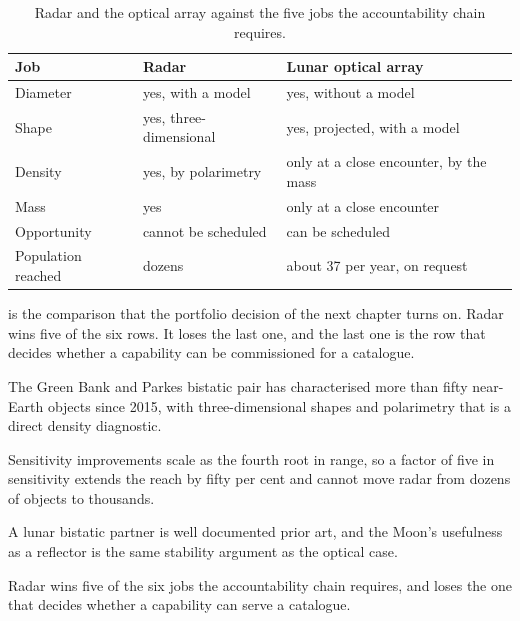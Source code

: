 \begin{table}[!htbp]
\centering
\small
\caption{Radar and the optical array against the five jobs the accountability
chain requires.}
\label{tab:radar-vs-optical}
\begin{tabularx}{\textwidth}{@{}P{1.35in}P{1.21in}Y@{}}
\toprule
{}
\textbf{Job} & \textbf{Radar} & \textbf{Lunar optical array} \\
\midrule
Diameter & yes, with a model & yes, without a model \\
Shape & yes, three-dimensional & yes, projected, with a model \\
Density & yes, by polarimetry & only at a close encounter, by the mass \\
Mass & yes & only at a close encounter \\
Opportunity & cannot be scheduled & can be scheduled \\
Population reached & dozens & about 37 per year, on request \\
\bottomrule
\end{tabularx}
\end{table}

 is the comparison that the portfolio decision
of the next chapter turns on. Radar wins five of the six rows. It loses the
last one, and the last one is the row that decides whether a capability can
be commissioned for a catalogue.

\begin{keytakeaways}
\item The Green Bank and Parkes bistatic pair has characterised more than
fifty near-Earth objects since 2015, with three-dimensional shapes and
polarimetry that is a direct density diagnostic.
\item Sensitivity improvements scale as the fourth root in range, so a factor
of five in sensitivity extends the reach by fifty per cent and cannot move
radar from dozens of objects to thousands.
\item A lunar bistatic partner is well documented prior art, and the Moon's
usefulness as a reflector is the same stability argument as the optical
case.
\item Radar wins five of the six jobs the accountability chain requires, and
loses the one that decides whether a capability can serve a catalogue.
\end{keytakeaways}
